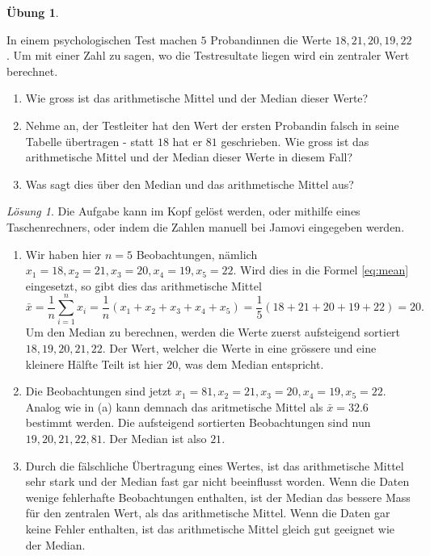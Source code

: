 \documentclass[
]{book}
\providecommand{\tightlist}{%
  \setlength{\itemsep}{0pt}\setlength{\parskip}{0pt}}
\theoremstyle{definition}
\theoremstyle{definition}
\theoremstyle{definition}
\newtheorem{exercise}{Übung}[chapter]
\theoremstyle{definition}
\theoremstyle{remark}
\newtheorem*{solution}{Lösung}
\begin{document}
\begin{exercise}
\protect\hypertarget{exr:theorie-mdn-mean}{}\label{exr:theorie-mdn-mean}

In einem psychologischen Test machen \(5\) Probandinnen die Werte \(18, 21, 20, 19, 22\). Um mit einer Zahl zu sagen, wo die Testresultate liegen wird ein zentraler Wert berechnet.

\begin{enumerate}
\def\labelenumi{(\alph{enumi})}
\tightlist
\item
  Wie gross ist das arithmetische Mittel und der Median dieser Werte?
\item
  Nehme an, der Testleiter hat den Wert der ersten Probandin falsch in seine Tabelle übertragen - statt \(18\) hat er \(81\) geschrieben. Wie gross ist das arithmetische Mittel und der Median dieser Werte in diesem Fall?
\item
  Was sagt dies über den Median und das arithmetische Mittel aus?
\end{enumerate}

\end{exercise}

\begin{solution}

Die Aufgabe kann im Kopf gelöst werden, oder mithilfe eines Taschenrechners, oder indem die Zahlen manuell bei Jamovi eingegeben werden.

\begin{enumerate}
\def\labelenumi{(\alph{enumi})}
\tightlist
\item
  Wir haben hier \(n=5\) Beobachtungen, nämlich \(x_1 = 18, x_2 = 21, x_3 = 20, x_4 = 19, x_5=22\). Wird dies in die Formel \eqref{eq:mean} eingesetzt, so gibt dies das arithmetische Mittel
  \[\bar{x} = \frac{1}{n}\sum^n_{i=1} x_i = \frac{1}{n}(x_1 + x_2 + x_3 + x_4 + x_5) =  \frac{1}{5}(18+ 21+ 20+ 19+ 22) = 20.\]
  Um den Median zu berechnen, werden die Werte zuerst aufsteigend sortiert \(18, 19, 20, 21, 22\). Der Wert, welcher die Werte in eine grössere und eine kleinere Hälfte Teilt ist hier \(20\), was dem Median entspricht.
\item
  Die Beobachtungen sind jetzt \(x_1 = 81, x_2 = 21, x_3 = 20, x_4 = 19, x_5=22\). Analog wie in (a) kann demnach das aritmetische Mittel als \(\bar{x} = 32.6\) bestimmt werden. Die aufsteigend sortierten Beobachtungen sind nun \(19, 20, 21, 22, 81\). Der Median ist also \(21\).
\item
  Durch die fälschliche Übertragung eines Wertes, ist das arithmetische Mittel sehr stark und der Median fast gar nicht beeinflusst worden. Wenn die Daten wenige fehlerhafte Beobachtungen enthalten, ist der Median das bessere Mass für den zentralen Wert, als das arithmetische Mittel. Wenn die Daten gar keine Fehler enthalten, ist das arithmetische Mittel gleich gut geeignet wie der Median.
\end{enumerate}

\end{solution}
\end{document}
